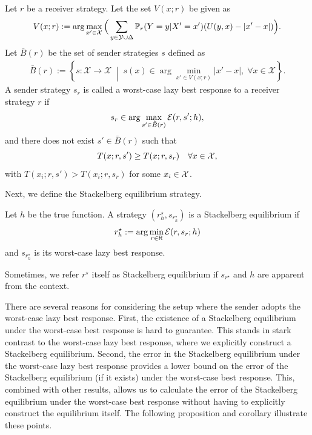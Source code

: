 \begin{defn}\label{def:Lazy_best_response}
Let $r$ be a receiver strategy. Let the set $V(x; r)$ be given as
	\[
	V(x; r) := \arg\max_{x' \in \mathcal{X}}\Big(\sum_{y \in \mathcal{Y} \cup \Delta} \mathbb{P}_r(Y=y|X'=x')(U(y,x)-|x'-x|)\Big).
	\]
	Let $\bar{B}(r)$ be the set of sender strategies $s$ defined as
	\begin{equation}
	\begin{aligned}
        \bar{B}(r) := \left\{ s : \mathcal{X} \to \mathcal{X} \;\middle\vert{}\; s(x) \in \arg\min_{x' \in V(x; r)} \vert{}x' - x\vert{}, \; \forall x \in \mathcal{X} \right\}.
	\end{aligned}
	\end{equation}
	A sender strategy $s_r$ is called a worst-case lazy best response to a receiver strategy $r$ if
	\begin{equation*}
		s_r \in \arg\max_{s' \in \bar{B}(r)} \mathcal{E}(r, s'; h),
	\end{equation*}
	and there does not exist $s' \in \bar{B}(r)$ such that
	\[
	T(x; r, s') \geq T(x; r, s_r) \quad \forall x \in \mathcal{X},
	\]
	with $T(x_i; r, s') > T(x_i; r, s_r)$ for some $x_i \in \mathcal{X}$.
\end{defn}
Next, we define the Stackelberg equilibrium strategy.
\begin{defn}
	Let $h$ be the true function. A strategy $(r^\star_h,s_{r^\star_h})$ is  a Stackelberg equilibrium if
	\[r^\star_{h} := \arg\min_{r \in \mathsf{R}}\mathcal{E}(r, s_r; h)\] and
    $s_{r^\star_h}$ is its worst-case lazy best response.
\end{defn}
\begin{notn}
    Sometimes, we refer $r^\star$ itself as Stackelberg equilibrium if $s_{r^\star}$ and $h$ are apparent from the context.
\end{notn}

There are several reasons for considering the setup where the sender adopts the worst-case lazy best response. First, the existence of a Stackelberg equilibrium under the worst-case best response is hard to guarantee. This stands in stark contrast to the worst-case lazy best response, where we explicitly construct a Stackelberg equilibrium. Second, the error in the Stackelberg equilibrium under the worst-case lazy best response provides a lower bound on the error of the Stackelberg equilibrium (if it exists) under the worst-case best response. This, combined with other results, allows us to calculate the error of the Stackelberg equilibrium under the worst-case best response without having to explicitly construct the equilibrium itself.
The following proposition and corollary illustrate these points.

